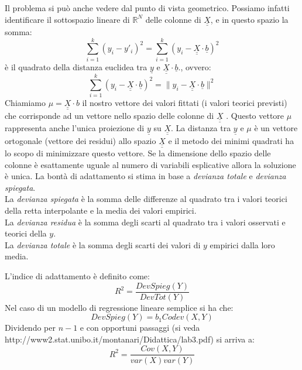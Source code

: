 \documentclass[]{article}
\def\doubleunderline#1{\underline{\underline{#1}}}
\begin{document}
Il problema si può anche vedere dal punto di vista geometrico. Possiamo infatti identificare il sottospazio lineare di $\mathbb{R}^N$ delle colonne di $\doubleunderline{X}$, e in questo spazio la somma:
\begin{equation}
\sum_{i=1}^k (y_i - y'_i)^2 = \sum_{i=1}^k (y_i - \doubleunderline{X} \cdot \underline{b})^2
\end{equation}
è il quadrato della distanza euclidea tra $\underline{y}$ e $\doubleunderline{X} \cdot \underline{b}$., ovvero:
\begin{equation}
\sum_{i=1}^k (y_i - \doubleunderline{X} \cdot \underline{b})^2 = \| y_i - \doubleunderline{X} \cdot \underline{b} \|^2
\end{equation}
Chiamiamo $\mu = \doubleunderline{X} \cdot b$ il nostro vettore dei valori fittati (i valori teorici previsti) che corrisponde ad un vettore nello spazio delle colonne di $\doubleunderline{X}$ . Questo vettore $\mu$ rappresenta anche l'unica proiezione di $\underline{y}$ su $\doubleunderline{X}$. La distanza tra $\underline{y}$ e $\mu$ è un vettore ortogonale (vettore dei residui) allo spazio $\doubleunderline{X}$ e il metodo dei minimi quadrati ha lo scopo di minimizzare questo vettore. Se la dimensione dello spazio delle colonne è esattamente uguale al numero di variabili esplicative allora la soluzione è unica.
La bontà di adattamento si stima in base a \textit{devianza totale} e
\textit{devianza spiegata}.\\
La \textit{devianza spiegata} è la somma delle differenze al quadrato tra i valori teorici della retta interpolante e la media dei valori empirici.\\
La \textit{devianza residua} è la somma degli scarti al quadrato tra i valori osservati e teorici della $y$. \\
La \textit{devianza totale} è la somma degli scarti dei valori di $y$ empirici dalla loro media.

L'indice di adattamento è definito come:
\begin{equation}
R^2 = \frac{DevSpieg(Y)}{DevTot(Y)}
\end{equation}
Nel caso di un modello di regressione lineare semplice si ha che:
\begin{equation}
DevSpieg(Y) = b_1 Codev(X, Y)
\end{equation}
Dividendo per $n-1$ e con opportuni passaggi (si veda http://www2.stat.unibo.it/montanari/Didattica/lab3.pdf) si arriva a:
\begin{equation}
R^2 = \frac{Cov(X, Y)}{var(X)var(Y)}
\end{equation}
\end{document}
